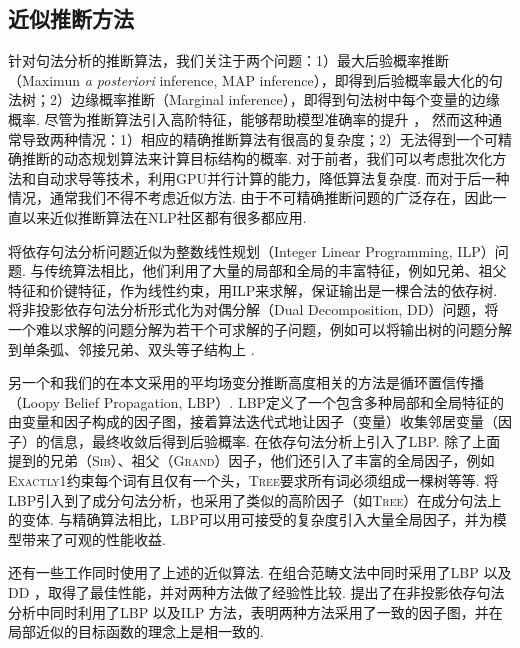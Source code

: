 \subsection{近似推断方法}
针对句法分析的推断算法，我们关注于两个问题：1）最大后验概率推断（Maximun \textit{a posteriori} inference, MAP inference），即得到后验概率最大化的句法树；2）边缘概率推断（Marginal inference），即得到句法树中每个变量的边缘概率.
尽管为推断算法引入高阶特征，能够帮助模型准确率的提升 \citep{mcdonald-pereira-2006-online,carreras-2007-experiments,koo-collins-2010-efficient,ma-zhao-2012-fourth}，
然而这种通常导致两种情况：1）相应的精确推断算法有很高的复杂度；2）无法得到一个可精确推断的动态规划算法来计算目标结构的概率.
对于前者，我们可以考虑批次化方法和自动求导等技术，利用GPU并行计算的能力，降低算法复杂度.
而对于后一种情况，通常我们不得不考虑近似方法.
由于不可精确推断问题的广泛存在，因此一直以来近似推断算法在NLP社区都有很多都应用.

\citet{martins-etal-2009-concise}将依存句法分析问题近似为整数线性规划（Integer Linear Programming, ILP）问题.
与传统算法相比，他们利用了大量的局部和全局的丰富特征，例如兄弟、祖父特征和价键特征，作为线性约束，用ILP来求解，保证输出是一棵合法的依存树.
\citet{koo-etal-2010-dual}将非投影依存句法分析形式化为对偶分解（Dual Decomposition, DD）问题，将一个难以求解的问题分解为若干个可求解的子问题，例如可以将输出树的问题分解到单条弧、邻接兄弟、双头等子结构上 \citep{martins-etal-2011-dual}.

另一个和我们的在本文采用的平均场变分推断高度相关的方法是循环置信传播（Loopy Belief Propagation, LBP）.
LBP定义了一个包含多种局部和全局特征的由变量和因子构成的因子图，接着算法迭代式地让因子（变量）收集邻居变量（因子）的信息，最终收敛后得到后验概率.
\citet{smith-eisner-2008-dependency,gormley-etal-2015-approximation}在依存句法分析上引入了LBP.
除了上面提到的兄弟（\textsc{Sib}）、祖父（\textsc{Grand}）因子，他们还引入了丰富的全局因子，例如\textsc{Exactly1}约束每个词有且仅有一个头，\textsc{Tree}要求所有词必须组成一棵树等等.
\citet{naradowsky-etal-2012-grammarless}将LBP引入到了成分句法分析，也采用了类似的高阶因子（如\textsc{Tree}）在成分句法上的变体.
与精确算法相比，LBP可以用可接受的复杂度引入大量全局因子，并为模型带来了可观的性能收益.

还有一些工作同时使用了上述的近似算法.
\citet{auli-lopez-2011-comparison}在组合范畴文法中同时采用了LBP \citep{smith-eisner-2008-dependency}以及DD \citep{koo-etal-2010-dual}，取得了最佳性能，并对两种方法做了经验性比较.
\citet{martins-etal-2010-turbo}提出了在非投影依存句法分析中同时利用了LBP \citep{smith-eisner-2008-dependency}以及ILP \citep{martins-etal-2009-concise}方法，表明两种方法采用了一致的因子图，并在局部近似的目标函数的理念上是相一致的.

